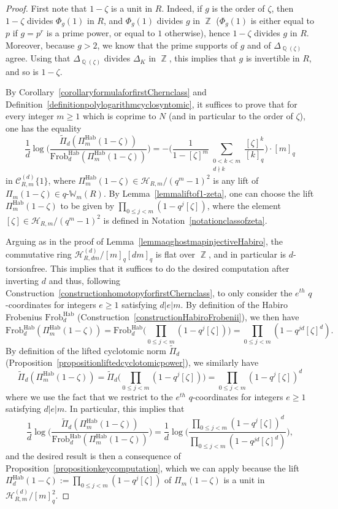 \documentclass[10pt,twoside]{scrarticle}
\theoremstyle{definition}
\DeclareMathOperator{\Z}{\mathbb{Z}}
\DeclareMathOperator{\Q}{\mathbb{Q}}
\newcommand{\CRm}{\mathcal{C}_{R,m}}
\newcommand{\Frob}{\mathrm{Frob}}
\newcommand{\Hab}{\mathrm{Hab}}
\newcommand{\qWm}{q\text{-}\mathbb{W}_m}
\renewcommand{\ge}{\geqslant}
\renewcommand{\le}{\leqslant}
\numberwithin{equation}{theorem}
\begin{document}
\begin{proof}
    First note that $1-\zeta$ is a unit in $R$. Indeed, if $g$ is the order of $\zeta$, then $1-\zeta$ divides $\Phi_g(1)$ in $R$, and $\Phi_g(1)$ divides $g$ in $\Z$ ($\Phi_g(1)$ is either equal to $p$ if $g=p^r$ is a prime power, or equal to $1$ otherwise), hence $1-\zeta$ divides $g$ in $R$. Moreover, because $g>2$, we know that the prime supports of $g$ and of $\Delta_{\Q(\zeta)}$ agree. Using that $\Delta_{\Q(\zeta)}$ divides $\Delta_K$ in $\Z$, this implies that $g$ is invertible in $R$, and so is $1-\zeta$.
    
    By Corollary~\ref{corollaryformulaforfirstChernclass} and Definition~\ref{definitionpolylogarithmcyclosyntomic}, it suffices to prove that for every integer $m \ge 1$ which is coprime to $N$ (and in particular to the order of $\zeta$), one has the equality
    $$\frac{1}{d}\log\Big(\frac{\tilde{\Pi}_d(\Pi_m^{\Hab}(1-\zeta))}{\Frob_d^{\Hab}(\Pi_m^{\Hab}(1-\zeta))}\Big) = -\Big( \frac{1}{1-[\zeta]^m} \sum_{\substack{0 < k < m \\ d \nmid k}} \frac{[\zeta]^k}{[k]_q}\Big) \cdot [m]_q$$
    in $\CRm^{(d)}\{1\}$, 
    where $\Pi_m^{\Hab}(1-\zeta) \in \mathcal{H}_{R,m}/(q^m-1)^2$ is any lift of $\Pi_m(1-\zeta) \in \qWm(R)$. By Lemma~\ref{lemmaliftof1-zeta}, one can choose the lift $\Pi_m^{\Hab}(1-\zeta)$ to be given by $\prod_{0 \le j < m} (1-q^j[\zeta])$, where the element $[\zeta] \in \mathcal{H}_{R,m}/(q^m-1)^2$ is defined in Notation~\ref{notationclassofzeta}. 
    
    Arguing as in the proof of Lemma~\ref{lemmaqghostmapinjectiveHabiro}, the commutative ring $\mathcal{H}_{R,dm}^{(d)}/[m]_q[dm]_q$ is flat over $\Z$, and in particular is $d$-torsionfree. This implies that it suffices to do the desired computation after inverting $d$ and thus, following Construction~\ref{constructionhomotopyforfirstChernclass}, to only consider the $e^{th}$ $q$-coordinates for integers $e \ge 1$ satisfying $d|e|m$. 
    By definition of the Habiro Frobenius $\Frob_d^{\Hab}$ (Construction~\ref{constructionHabiroFrobenii}), we then have
    $$\Frob_d^{\Hab}(\Pi_m^{\Hab}(1-\zeta)) = \Frob_d^{\Hab}\Big(\prod_{0 \le j < m} (1-q^j[\zeta])\Big) = \prod_{0 \le j < m} (1-q^{jd}[\zeta]^d).$$
    By definition of the lifted cyclotomic norm $\tilde{\Pi}_d$ (Proposition~\ref{propositionliftedcyclotomicpower}), we similarly have
    $$\tilde{\Pi}_d(\Pi_m^{\Hab}(1-\zeta)) = \tilde{\Pi}_d\Big(\prod_{0 \le j < m} (1-q^j[\zeta])\Big) = \prod_{0 \le j < m} (1-q^j[\zeta])^d$$
    where we use the fact that we restrict to the $e^{th}$ $q$-coordinates for integers $e \ge 1$ satisfying $d|e|m$. 
    In particular, this implies that
    $$\frac{1}{d}\log\Big(\frac{\tilde{\Pi}_d(\Pi_m^{\Hab}(1-\zeta))}{\Frob_d^{\Hab}(\Pi_m^{\Hab}(1-\zeta))}\Big) = \frac{1}{d}\log\Big(\frac{\prod_{0 \le j < m}(1-q^j[\zeta])^d}{\prod_{0 \le j < m}(1-q^{jd}[\zeta]^d)}\Big),$$
    and the desired result is then a consequence of Proposition~\ref{propositionkeycomputation}, which we can apply because the lift $\Pi_d^{\Hab}(1-\zeta) := \prod_{0 \le j < m}(1-q^j[\zeta])$ of $\Pi_m(1-\zeta)$ is a unit in $\mathcal{H}_{R,m}^{(d)}/[m]_q^2$.
\end{proof}
\end{document}

